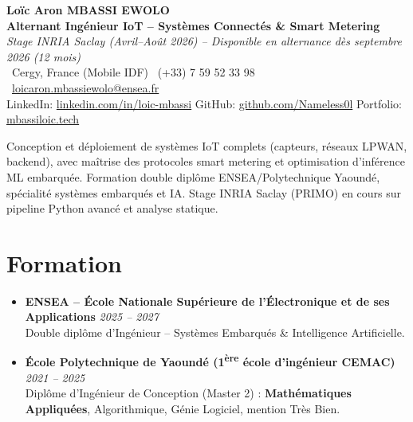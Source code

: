 \documentclass[a4paper,11pt]{article}
\begin{document}
\begin{center}
    {\Large \textbf{Lo\"ic Aron MBASSI EWOLO}} \\ \vspace{4pt}
    \textbf{\large Alternant Ing\'enieur IoT -- Syst\`emes Connect\'es \& Smart Metering} \\
    \textit{\small Stage INRIA Saclay (Avril--Ao\^ut 2026) -- Disponible en alternance d\`es septembre 2026 (12 mois)} \\ \vspace{4pt}
    \small
    \Pointinghand\ Cergy, France (Mobile IDF) \quad \Mobilefone\ (+33) 7 59 52 33 98 \quad
    {\color{primary}\Letter\ \href{mailto:loicaron.mbassiewolo@ensea.fr}{loicaron.mbassiewolo@ensea.fr}} \\ \vspace{2pt}
    {\color{primary}LinkedIn: \href{https://www.linkedin.com/in/loic-mbassi/}{linkedin.com/in/loic-mbassi}} \quad
    {\color{primary}GitHub: \href{https://github.com/Nameless0l}{github.com/Nameless0l}} \quad
    {\color{primary}Portfolio: \href{https://mbassiloic.tech}{mbassiloic.tech}}
\end{center}
\vspace{-6pt}
\noindent\small{Conception et d\'eploiement de syst\`emes IoT complets (capteurs, r\'eseaux LPWAN, backend), avec maîtrise des protocoles smart metering et optimisation d'inf\'erence ML embarqu\'ee. Formation double dipl\^ome ENSEA/Polytechnique Yaound\'e, sp\'ecialit\'e syst\`emes embarqu\'es et IA. Stage INRIA Saclay (PRIMO) en cours sur pipeline Python avanc\'e et analyse statique.}

\section{Formation}
\begin{itemize}[leftmargin=*, label=\tiny$\bullet$, nosep]
    \item \textbf{ENSEA -- \'Ecole Nationale Sup\'erieure de l'\'Electronique et de ses Applications} \hfill \textit{2025 -- 2027} \\
    \small{Double dipl\^ome d'Ing\'enieur -- Syst\`emes Embarqu\'es \& Intelligence Artificielle.}
    \item \textbf{\'Ecole Polytechnique de Yaound\'e (1\textsuperscript{\`ere} \'ecole d'ing\'enieur CEMAC)} \hfill \textit{2021 -- 2025} \\
    \small{Dipl\^ome d'Ing\'enieur de Conception (Master 2) : \textbf{Math\'ematiques Appliqu\'ees}, Algorithmique, G\'enie Logiciel, mention Tr\`es Bien.}
\end{itemize}
\end{document}
